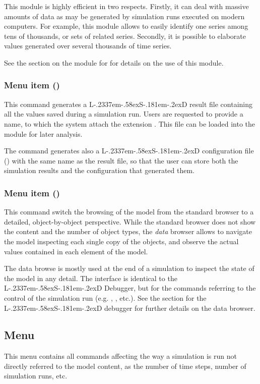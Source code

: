\documentclass [11pt,a4paper] {book}
\def\LsD{{L\kern-.2337em\lower-.58ex\hbox{S}\kern-.181em\lower-.2ex\hbox{D}}\xspace}
\begin{document}
This module is highly efficient in two respects. Firstly, it can deal with massive amounts of data as may be generated by simulation runs executed on modern computers. For example, this module allows to easily identify one series among tens of thousands, or sets of related series. Secondly, it is possible to elaborate values generated over several thousands of time series.

See the section on the module for  for details on the use of this module.

\subsubsection{Menu item  ()}

This command generates a \LsD result file containing all the values saved during a simulation run. Users are requested to provide a name, to which the system attach the extension . This file can be loaded into the module  for later analysis.

The command generates also a \LsD configuration file () with the same name as the result file, so that the user can store both the simulation results and the configuration that generated them.

\subsubsection{Menu item  ()}

This command switch the browsing of the model from the standard browser to a detailed, object-by-object perspective. While the standard browser does not show the content and the number of object types, the \textit{data} browser allows to navigate the model inspecting each single copy of the objects, and observe the actual values contained in each element of the model.

The data browse is mostly used at the end of a simulation to inspect the state of the model in any detail. The interface is identical to the \LsD Debugger, but for the commands referring to the control of the simulation run (e.g. , , etc.). See the section for the \LsD debugger for further details on the data browser.


\subsection{Menu }
This menu contains all commands affecting the way a simulation is run not directly referred to the model content, as the number of time steps, number of simulation runs, etc. 
\end{document}
